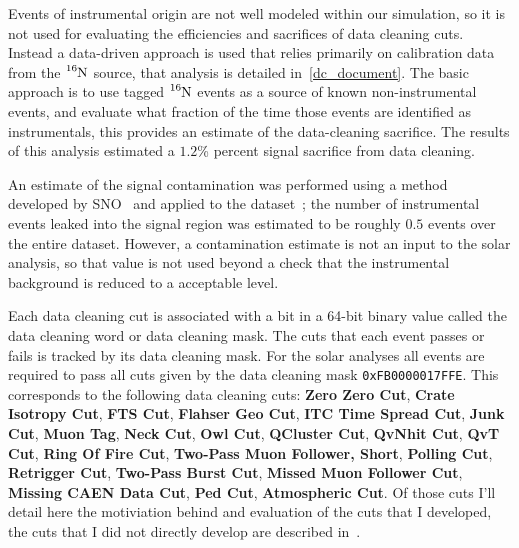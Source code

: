 Events of instrumental origin are not well modeled within our simulation,
so it is not used for evaluating the efficiencies and sacrifices of
data cleaning cuts.
Instead a data-driven approach is used that relies primarily on calibration
data from the $\ce{^{16}N}$ source, that analysis is detailed in~\ref{dc_document}.%
The basic approach is to use tagged $\ce{^{16}N}$ events as a source of known
non-instrumental events, and evaluate what fraction of the time those events
are identified as instrumentals, this provides an estimate of the data-cleaning
sacrifice. The results of this analysis estimated a $1.2$\% percent signal
sacrifice from data cleaning.

An estimate of the signal contamination was performed using a method developed
by SNO~\citep{neil_thesis} and applied to the dataset~\citep{dc_document};
the number of instrumental events leaked into the signal region was estimated
to be roughly $0.5$ events over the entire dataset.
However, a contamination estimate is not an input to the solar analysis,
so that value is not used beyond a check that the instrumental background
is reduced to a acceptable level.

Each data cleaning cut is associated with a bit in a 64-bit binary value called
the data cleaning word or data cleaning mask.
The cuts that each event passes or fails is tracked by its data cleaning mask.
For the solar analyses all events are required to pass all cuts
given by the data cleaning mask \texttt{0xFB0000017FFE}.
This corresponds to the following data cleaning cuts:
    \textbf{Zero Zero Cut},
    \textbf{Crate Isotropy Cut},
    \textbf{FTS Cut},
    \textbf{Flahser Geo Cut},
    \textbf{ITC Time Spread Cut},
    \textbf{Junk Cut},
    \textbf{Muon Tag},
    \textbf{Neck Cut},
    \textbf{Owl Cut},
    \textbf{QCluster Cut},
    \textbf{QvNhit Cut},
    \textbf{QvT Cut},
    \textbf{Ring Of Fire Cut},
    \textbf{Two-Pass Muon Follower, Short},
    \textbf{Polling Cut},
    \textbf{Retrigger Cut},
    \textbf{Two-Pass Burst Cut},
    \textbf{Missed Muon Follower Cut},
    \textbf{Missing CAEN Data Cut},
    \textbf{Ped Cut},
    \textbf{Atmospheric Cut}.
Of those cuts I'll detail here the motiviation behind and evaluation of the
cuts that I developed, the cuts that I did not directly develop are described in~\citep{dc_document}.

